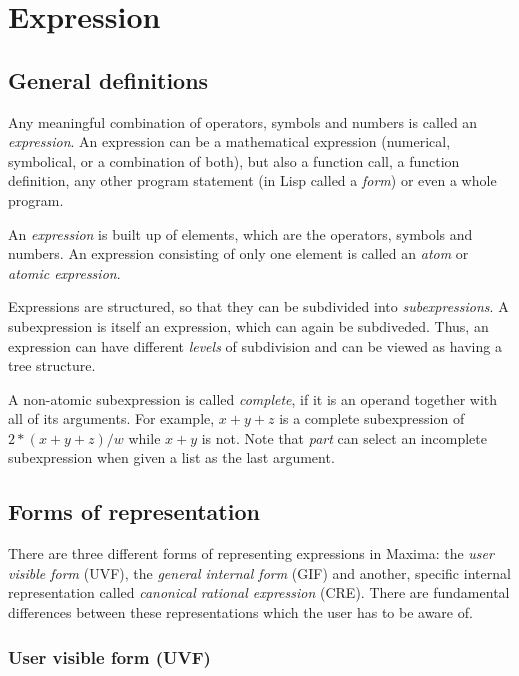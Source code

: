 \documentclass[../Maxima_Workbook.tex]{subfiles}
\begin{document}
	
\chapter{Expression}

\section{General definitions}

Any meaningful combination of operators, symbols and numbers is called an \emph{expression}. An expression can be a mathematical expression (numerical, symbolical, or a combination of both), but also a function call, a function definition, any other program statement (in Lisp called a \emph{form}) or even a whole program. 

\lz An \emph{expression} is built up of elements, which are the operators, symbols and numbers. An expression consisting of only one element is called an \emph{atom} or \emph{atomic expression}. 

\lz Expressions are structured, so that they can be subdivided into \emph{subexpressions}. A subexpression is itself an expression, which can again be subdiveded. Thus, an expression can have different \emph{levels} of subdivision and can be viewed as having a tree structure.

\lz A non-atomic subexpression is called \emph{complete}, if it is an operand together with all of its arguments. For example, $ x+y+z $ is a complete subexpression of $ 2*(x+y+z)/w $ while $ x+y $ is not. Note that \emph{part} can select an incomplete subexpression when given a list as the last argument.

\section{Forms of representation}

There are three different forms of representing expressions in Maxima: the \emph{user visible form} (UVF), the \emph{general internal form} (GIF) and another, specific internal representation called \emph{canonical rational expression} (CRE). There are fundamental differences between these representations which the user has to be aware of.

\subsection{User visible form (UVF)} 
\end{document}

